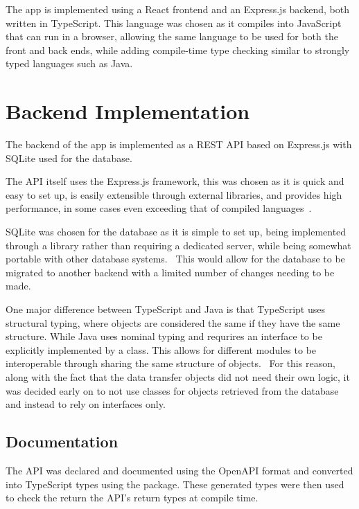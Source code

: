 
The \chef{} app is implemented using a React frontend and an Express.js backend, both written in TypeScript.
This language was chosen as it compiles into JavaScript that can run in a browser, allowing the same language to be used for both
the front and back ends, while adding compile-time type checking similar to strongly typed languages such as Java.

\section{Backend Implementation}

The backend of the app is implemented as a REST API based on Express.js with SQLite
used for the database.


The API itself uses the Express.js framework, this was chosen as it is quick and easy to set up, is easily extensible
through external libraries, and provides high performance, in some cases even exceeding that of
compiled languages~\cite{karlsson_performance_2021}.

SQLite was chosen for the database as it is simple to set up, being implemented through
a library rather than requiring a dedicated server, while being somewhat portable with other
database systems.~\cite{kreibich_using_2010} This would allow for the database to be migrated to
another backend with a limited number of changes needing to be made.

One major difference between TypeScript and Java is that TypeScript uses structural typing, where objects are considered
the same if they have the same structure. While Java uses nominal typing and requrires an interface to be explicitly
implemented by a class. This allows for different modules to be interoperable through sharing the same structure of objects.~\cite{gil_whiteoak_2008}
For this reason, along with the fact that the data transfer objects did not need their own logic, it was decided early on
to not use classes for objects retrieved from the database and instead to rely on interfaces only.


\subsection{Documentation}
The API was declared and documented using the OpenAPI format and converted
into TypeScript types using the  package. These
generated types were then used to check the return the API's return types at compile time.

